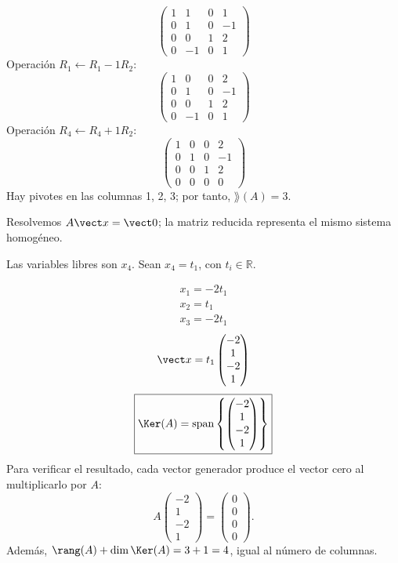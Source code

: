 \[
\begin{pmatrix}1&1&0&1\\0&1&0&-1\\0&0&1&2\\0&-1&0&1\end{pmatrix}
\]
Operación $R_{1}\leftarrow R_{1}-1R_{2}$:
\[
\begin{pmatrix}1&0&0&2\\0&1&0&-1\\0&0&1&2\\0&-1&0&1\end{pmatrix}
\]
Operación $R_{4}\leftarrow R_{4}+1R_{2}$:
\[
\begin{pmatrix}1&0&0&2\\0&1&0&-1\\0&0&1&2\\0&0&0&0\end{pmatrix}
\]
Hay pivotes en las columnas 1, 2, 3; por tanto, $\boxed{\rang(A)=3}$.

Resolvemos $A\vect x=\vect0$; la matriz reducida representa el mismo sistema homogéneo.

Las variables libres son $x_{4}$. Sean $x_{4}=t_{1}$, con $t_i\in\mathbb R$.

\[
\begin{aligned}x_{1}=- 2 t_{1}\\x_{2}=t_{1}\\x_{3}=- 2 t_{1}\end{aligned}
\]
\[
\vect x=t_{1}\begin{pmatrix}-2\\1\\-2\\1\end{pmatrix}
\]
\[
\boxed{\Ker(A)=\operatorname{span}\left\{\begin{pmatrix}-2\\1\\-2\\1\end{pmatrix}\right\}}
\]
Para verificar el resultado, cada vector generador produce el vector cero al multiplicarlo por $A$:
\[
A\begin{pmatrix}-2\\1\\-2\\1\end{pmatrix}=\begin{pmatrix}0\\0\\0\\0\end{pmatrix}.
\]
Además, $\rang(A)+\dim\Ker(A)=3+1=4$, igual al número de columnas.


